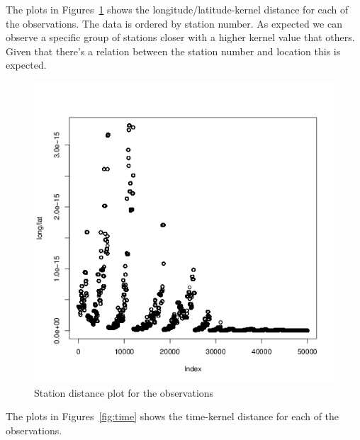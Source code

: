 \documentclass[a4paper, twocolumn]{article}
\begin{document}
    The plots in Figures~\ref{fig:dist} shows the longitude/latitude-kernel distance for each of the observations. The data is ordered by station number. As expected we can observe a specific group of stations closer with a higher kernel value that others. Given that there's a relation between the station number and location this is expected.
    \begin{figure}[H]
    \centering
        \caption{Station distance plot for the observations}\label{fig:dist}
	    \begin{minipage}[]{0.32\textwidth}
	    	\includegraphics[width=\textwidth]{share/1_dist.png}
	    \end{minipage}
    \end{figure}

    The plots in Figures~\ref{fig:time} shows the time-kernel distance for each of the observations.  
\end{document}
